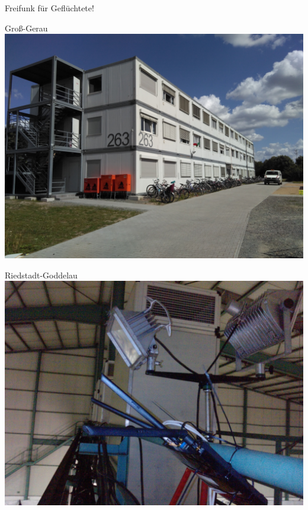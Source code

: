 \documentclass[t]{beamer}
\begin{document}
  \begin{frame}
    \huge
    \vspace{3em}
    \center
    Freifunk für Geflüchtete!
  \end{frame}


  \begin{frame}{Groß-Gerau}
    \center
    \includegraphics[height=0.75\textheight]{images/2016-08-08_ggsportpark.jpg}
  \end{frame}

  \begin{frame}{Riedstadt-Goddelau}
    \center
    \includegraphics[height=0.75\textheight]{images/heae-goddelau-traeger.jpg}
  \end{frame}
\end{document}
